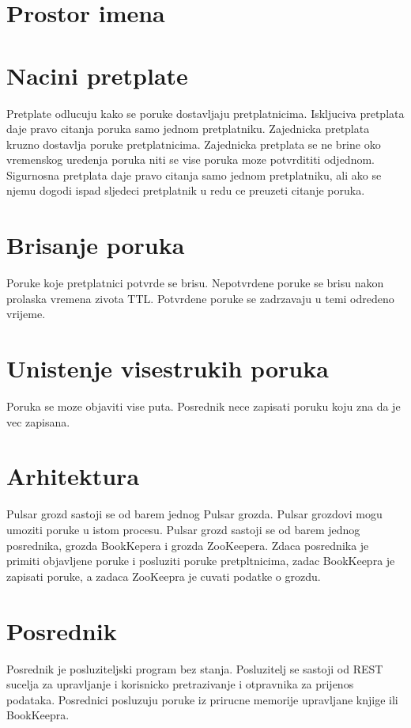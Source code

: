 \documentclass[times, utf8, diplomski, numeric]{fer}
\begin{document}
\chapter{Prostor imena}

\chapter{Nacini pretplate}
Pretplate odlucuju kako se poruke dostavljaju pretplatnicima. Iskljuciva pretplata daje pravo citanja poruka samo jednom pretplatniku. Zajednicka pretplata kruzno dostavlja poruke pretplatnicima. Zajednicka pretplata se ne brine oko vremenskog uredenja poruka niti se vise poruka moze potvrdititi odjednom. Sigurnosna pretplata daje pravo citanja samo jednom pretplatniku, ali ako se njemu dogodi ispad sljedeci pretplatnik u redu ce preuzeti citanje poruka.

\chapter{Brisanje poruka}
Poruke koje pretplatnici potvrde se brisu. Nepotvrdene poruke se brisu nakon prolaska vremena zivota TTL. Potvrdene poruke se zadrzavaju u temi odredeno vrijeme.

\chapter{Unistenje visestrukih poruka}
Poruka se moze objaviti vise puta. Posrednik nece zapisati poruku koju zna da je vec zapisana.

\chapter{Arhitektura}
Pulsar grozd sastoji se od barem jednog Pulsar grozda. Pulsar grozdovi mogu umoziti poruke u istom procesu. Pulsar grozd sastoji se od barem jednog posrednika, grozda BookKepera i grozda ZooKeepera. Zdaca posrednika je primiti objavljene poruke i posluziti poruke pretpltnicima, zadac BookKeepra je zapisati poruke, a zadaca ZooKeepra je cuvati podatke o grozdu.

\chapter{Posrednik}
Posrednik je posluziteljski program bez stanja. Posluzitelj se sastoji od REST sucelja za upravljanje i korisnicko pretrazivanje i otpravnika za prijenos podataka. Posrednici posluzuju poruke iz prirucne memorije upravljane knjige ili BookKeepra.
\end{document}
